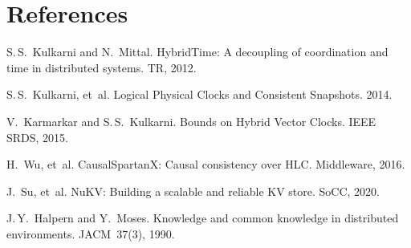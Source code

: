 \documentclass[../../../OAE-SPEC-MAIN.tex]{subfiles}
\begin{document}
\section*{References}

\begin{enumerate}[label={[}\arabic*{]}]
\item S.\,S.\ Kulkarni and N.\ Mittal.  HybridTime: A decoupling of
      coordination and time in distributed systems.  TR, 2012.
\item S.\,S.\ Kulkarni, et al.  Logical Physical Clocks and Consistent
      Snapshots.  2014.
\item V.\ Karmarkar and S.\,S.\ Kulkarni.  Bounds on Hybrid Vector
      Clocks.  IEEE SRDS, 2015.
\item H.\ Wu, et al.  CausalSpartanX: Causal consistency over HLC.
      Middleware, 2016.
\item J.\ Su, et al.  NuKV: Building a scalable and reliable KV store.
      SoCC, 2020.
\item J.\,Y.\ Halpern and Y.\ Moses.  Knowledge and common knowledge in
      distributed environments.  JACM 37(3), 1990.
\end{enumerate}
\end{document}
